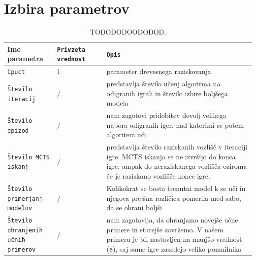 \documentclass[a4paper, 12pt]{book}
\begin{document}
\section{Izbira parametrov}

\begin{table}
	\begin{center}
		\begin{tabular}{p{0.2\linewidth}|p{0.2\linewidth}|p{0.6\linewidth}}
			Ime parametra                             & {\tt Privzeta vrednost} & {\tt Opis} \\ \hline
			{\tt Cpuct}                               & 1 						& parameter drevesnega raziskovanja \\
			{\tt Število iteracij}                    & /						& predstavlja število učenj algoritma na odigranih igrah in število izbire boljšega modela\\
			{\tt Število epizod}                      & / 						& nam zagotovi pridobitev dovolj velikega nabora odigranih iger, nad katerimi se potem algoritem uči \\
			{\tt Število MCTS iskanj}                 & / 						& predstavlja število raziskanih vozlišč v iteraciji igre. 
														 						  MCTS iskanja se ne izvršijo do konca igre, ampak do neraziskanega vozlišča oziroma če je raziskano vozlišče konec igre.\\
			{\tt Število primerjanj modelov}  		  & / 						& Kolikokrat se bosta trenutni model k se uči in njegova prejšna različica pomerila med sabo, da se ohrani boljši \\
			{\tt Število ohranjenih učnih primerov}   & / 						& nam zagotavlja, da ohranjamo novejše učne primere in starejše zavržemo. 
																			      V našem primeru je bil nastavljen na manjšo vrednost (8), saj same igre zasedejo veliko pomnilnika \\
		\end{tabular}
	\end{center}
	\caption{TODODODOODODOD.}
	\label{tableEncodersOneHot}
\end{table}

\end{document}
